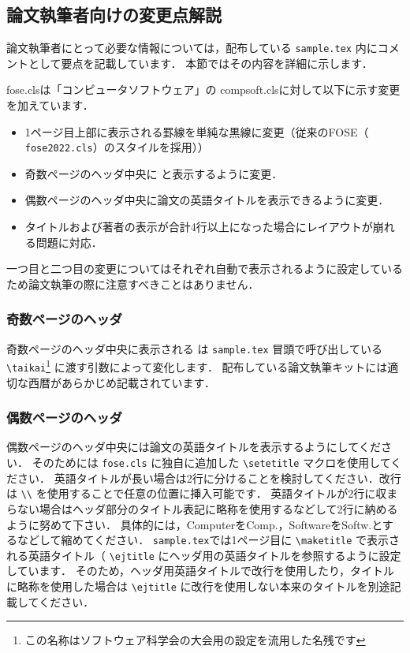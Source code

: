 \documentclass[T,J]{fose} %
\newcommand{\foseclassfile}{fose.cls}
\begin{document}
\subsection{論文執筆者向けの変更点解説}\label{subsec:forauthors}
論文執筆者にとって必要な情報については，配布している \texttt{sample.tex} 内にコメントとして要点を記載しています．
本節ではその内容を詳細に示します．

\foseclassfile は「コンピュータソフトウェア」の compsoft.clsに対して以下に示す変更を加えています．
\begin{itemize}
	\item 1ページ目上部に表示される罫線を単純な黒線に変更（従来のFOSE（ \texttt{fose2022.cls}）のスタイルを採用））
	\item 奇数ページのヘッダ中央に \textbf{\foseabbrev} と表示するように変更．
	\item 偶数ページのヘッダ中央に論文の英語タイトルを表示できるように変更．
	\item タイトルおよび著者の表示が合計4行以上になった場合にレイアウトが崩れる問題に対応．
\end{itemize}

一つ目と二つ目の変更についてはそれぞれ自動で表示されるように設定しているため論文執筆の際に注意すべきことはありません．


\subsubsection{奇数ページのヘッダ}
奇数ページのヘッダ中央に表示される \textbf{\foseabbrev} は \texttt{sample.tex} 冒頭で呼び出している \verb|\taikai|\footnote{この名称はソフトウェア科学会の大会用の設定を流用した名残です} に渡す引数によって変化します．
配布している論文執筆キットには適切な西暦があらかじめ記載されています．


\subsubsection{偶数ページのヘッダ}
偶数ページのヘッダ中央には論文の英語タイトルを表示するようにしてください．
そのためには \texttt{\foseclassfile} に独自に追加した \verb|\setetitle| マクロを使用してください．
英語タイトルが長い場合は2行に分けることを検討してください．改行は \verb|\\| を使用することで任意の位置に挿入可能です．
英語タイトルが2行に収まらない場合はヘッダ部分のタイトル表記に略称を使用するなどして2行に納めるように努めて下さい．
具体的には，ComputerをComp.，SoftwareをSoftw.とするなどして縮めてください．
\texttt{sample.tex}では1ページ目に \verb|\maketitle| で表示される英語タイトル（ \verb|\ejtitle| にヘッダ用の英語タイトルを参照するように設定しています．
そのため，ヘッダ用英語タイトルで改行を使用したり，タイトルに略称を使用した場合は \verb|\ejtitle| に改行を使用しない本来のタイトルを別途記載してください．
\end{document}
